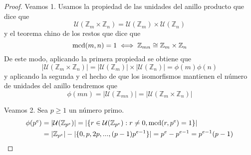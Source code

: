 \begin{proof}
Veamos 1. Usamos la propiedad de las unidades del anillo producto que dice que $$\mathcal U(\mathbb{Z}_m \times \mathbb{Z}_n) = \mathcal U(\mathbb{Z}_m) \times \mathcal U(\mathbb{Z}_n)$$ y el teorema chino de los restos que dice que $$\operatorname*{mcd}(m,n) = 1 \iff \mathbb{Z}_{mn} \cong \mathbb{Z}_m \times \mathbb{Z}_n$$ De este modo, aplicando la primera propiedad se obtiene que $$|\mathcal U(\mathbb{Z}_m \times \mathbb{Z}_n)| = |\mathcal U(\mathbb{Z}_m)| \times |\mathcal U(\mathbb{Z}_n)| = \phi(m) \phi(n)$$ y aplicando la segunda y el hecho de que los isomorfismos mantienen el número de unidades del anillo tendremos que $$\phi(mn) = |\mathcal U(\mathbb{Z}_{mn})| = |\mathcal U(\mathbb{Z}_m \times \mathbb{Z}_n)|$$

Veamos 2. Sea $p \ge 1$ un número primo. 
\begin{align*}
    \phi(p^e) &= |\mathcal U(\mathbb{Z}_{p^e})| = |\{r \in \mathcal U(\mathbb{Z}_{p^e}) : r \neq 0, \operatorname*{mcd}(r,p^e) = 1\}| \\
              &= |\mathbb{Z}_{p^e}|-|\{0,p,2p,...,(p-1)p^{e-1}\}| = p^e - p^{e-1} = p^{e-1}(p-1)
\end{align*}
\end{proof}
